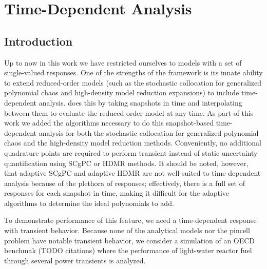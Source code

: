 
\chapter{Time-Dependent Analysis} %

\label{ChapterTime} %



\section{Introduction}

Up to now in this work we have restricted ourselves to models with a set of single-valued responses.  One of the strengths
of the \raven{} framework is its innate ability to extend reduced-order models (such as the stochastic 
collocation for generalized polynomial chaos and high-density model reduction expansions) to
include time-dependent analysis.  \raven{} does this by taking snapshots in time and interpolating between them to evaluate
the reduced-order model at any time.  As part of this work we added the algorithms necessary to do this snapshot-based
time-dependent analysis for both the stochastic collocation for generalized polynomial chaos and the high-density model
reduction methods. Conveniently, no additional quadrature points are required to perform transient instead of static
uncertainty quantification using SCgPC or HDMR methods.  It should be noted, however, that adaptive SCgPC and adaptive
HDMR are not well-suited to time-dependent analysis because of the plethora of responses; effectively, there is a
full set of responses for each snapshot in time, making it difficult for the adaptive algorithms to determine the
ideal polynomials to add.

To demonstrate performance of this feature, we need a time-dependent response with transient behavior.
Because none of the analytical models nor the \mammoth{} pincell problem have notable transient behavior, we consider
a \bison{} simulation of an OECD benchmak (TODO citations) where the performance of light-water reactor fuel 
through several power transients is
analyzed.

